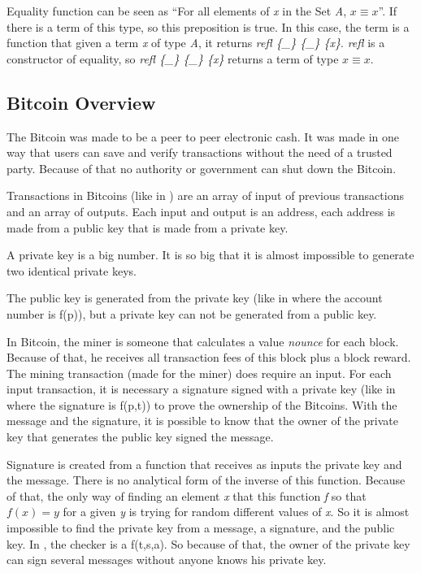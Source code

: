 Equality function can be seen as
``For all elements of \emph{x} in the Set \emph{A}, $x \equiv x$''.
If there is a term of this type, so this preposition is true.
In this case, the term is a function that given a term \emph{x} of type \emph{A},
it returns \emph{refl \{\_\} \{\_\} \{x\}}.
\emph{refl} is a constructor of equality, so \emph{refl \{\_\} \{\_\} \{x\}}
returns a term of type $x \equiv x$.

\subsection{Bitcoin Overview}

The Bitcoin was made to be a peer to peer electronic cash.
It was made in one way that users can save and verify transactions without the need of a trusted party.
Because of that no authority or government can shut down the Bitcoin.


Transactions in Bitcoins (like in ) are an array of input of
previous transactions and an array of outputs.
Each input and output is an address, each address is made from a public key
that is made from a private key.


A private key is a big number.
It is so big that it is almost impossible to generate two identical private keys.

The public key is generated from the private key
(like in  where the account number is f(p)),
but a private key can not be generated from a public key.

In Bitcoin, the miner is someone that calculates a value \emph{nounce} for each block.
Because of that, he receives all transaction fees of this block plus a block reward.
The mining transaction (made for the miner) does require an input.
For each input transaction, it is necessary a signature signed with a private key
(like in  where the signature is f(p,t))
to prove the ownership of the Bitcoins.
With the message and the signature, it is possible to know that the owner of the private key
that generates the public key signed the message.

Signature is created from a function that receives as inputs the private key and the message.
There is no analytical form of the inverse of this function.
Because of that, the only way of finding an element \emph{x} that this function \emph{f} so
that $f(x) = y$ for a given \emph{y} is trying for random different values of \emph{x}.
So it is almost impossible to find the private key from a message, a signature, and the public key.
In , the checker is a f(t,s,a).
So because of that, the owner of the private key can sign several messages without anyone knows
his private key.


